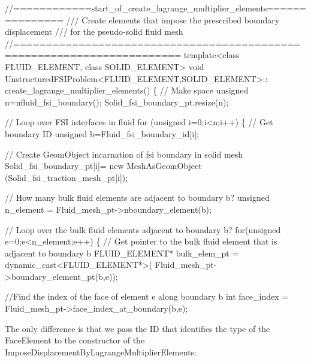 \begin{DoxyCodeInclude}
\textcolor{comment}{//============start\_of\_create\_lagrange\_multiplier\_elements===============}
\textcolor{comment}{/// Create elements that impose the prescribed boundary displacement}
\textcolor{comment}{}\textcolor{comment}{/// for the pseudo-solid fluid mesh}
\textcolor{comment}{}\textcolor{comment}{//=======================================================================}
\textcolor{keyword}{template}<\textcolor{keyword}{class} FLUID\_ELEMENT, \textcolor{keyword}{class} SOLID\_ELEMENT>
\textcolor{keywordtype}{void} UnstructuredFSIProblem<FLUID\_ELEMENT,SOLID\_ELEMENT>::
create\_lagrange\_multiplier\_elements()
\{
 \textcolor{comment}{// Make space}
 \textcolor{keywordtype}{unsigned} n=nfluid\_fsi\_boundary();
 Solid\_fsi\_boundary\_pt.resize(n);
    
 \textcolor{comment}{// Loop over FSI interfaces in fluid}
 \textcolor{keywordflow}{for} (\textcolor{keywordtype}{unsigned} i=0;i<n;i++)
  \{   
   \textcolor{comment}{// Get boundary ID}
   \textcolor{keywordtype}{unsigned} b=Fluid\_fsi\_boundary\_id[i];
   
   \textcolor{comment}{// Create  GeomObject incarnation of fsi boundary in solid mesh}
   Solid\_fsi\_boundary\_pt[i]=
    \textcolor{keyword}{new} MeshAsGeomObject
    (Solid\_fsi\_traction\_mesh\_pt[i]);
   
   \textcolor{comment}{// How many bulk fluid elements are adjacent to boundary b?}
   \textcolor{keywordtype}{unsigned} n\_element = Fluid\_mesh\_pt->nboundary\_element(b);
   
   \textcolor{comment}{// Loop over the bulk fluid elements adjacent to boundary b?}
   \textcolor{keywordflow}{for}(\textcolor{keywordtype}{unsigned} e=0;e<n\_element;e++)
    \{
     \textcolor{comment}{// Get pointer to the bulk fluid element that is adjacent to boundary b}
     FLUID\_ELEMENT* bulk\_elem\_pt = \textcolor{keyword}{dynamic\_cast<}FLUID\_ELEMENT*\textcolor{keyword}{>}(
      Fluid\_mesh\_pt->boundary\_element\_pt(b,e));

     \textcolor{comment}{//Find the index of the face of element e along boundary b}
     \textcolor{keywordtype}{int} face\_index = Fluid\_mesh\_pt->face\_index\_at\_boundary(b,e);

\end{DoxyCodeInclude}


The only difference is that we pass the ID that identifies the type of the {\ttfamily Face\+Element} to the constructor of the {\ttfamily Impose\+Displacement\+By\+Lagrange\+Multiplier\+Elements\+:} 


